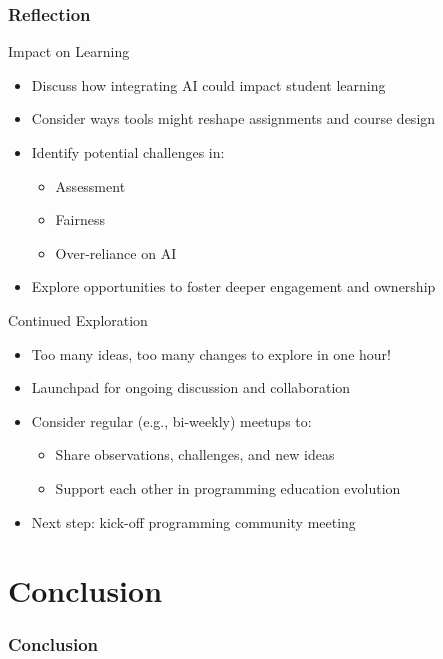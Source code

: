 \documentclass[xcolor={dvipsnames}, aspectratio=169]{beamer}
\begin{document}
\section{Reflection}

\begin{frame}{Impact on Learning}
  \begin{itemize}
    \item Discuss how integrating AI could impact student learning
    \item Consider ways tools might reshape assignments and course design
    \item Identify potential challenges in:
      \begin{itemize}
        \item Assessment
        \item Fairness
        \item Over-reliance on AI
      \end{itemize}
    \item Explore opportunities to foster deeper engagement and ownership
  \end{itemize}
\end{frame}

\begin{frame}{Continued Exploration}
  \begin{itemize}
    \item Too many ideas, too many changes to explore in one hour!
    \item Launchpad for ongoing discussion and collaboration
    \item Consider regular (e.g., bi-weekly) meetups to:
      \begin{itemize}
        \item Share observations, challenges, and new ideas
        \item Support each other in programming education evolution
      \end{itemize}
    \item Next step: kick-off programming community meeting
  \end{itemize}
\end{frame}

\part[Conclusion]{Conclusion}
\section{Conclusion}
\end{document}
